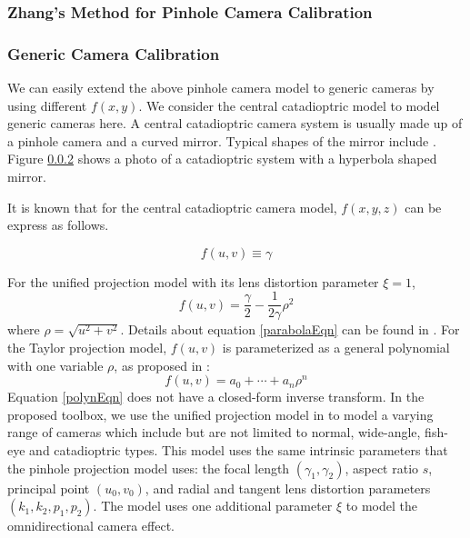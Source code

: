 \documentclass{report}
\begin{document}
\subsubsection{Zhang's Method for Pinhole Camera Calibration}

\subsubsection{Generic Camera Calibration}


We can easily extend the above pinhole camera model to generic cameras by using different $f(x, y)$. We consider the central catadioptric model to model generic cameras here. A central catadioptric camera system is usually made up of a pinhole camera and a curved mirror. Typical shapes of the mirror include . Figure \ref{} shows a photo of a catadioptric system with a hyperbola shaped mirror. 

It is known \cite{} that for the central catadioptric camera model, $f(x, y, z)$ can be express as follows. 
\begin{equation}
\end{equation}


\begin{equation}
f(u, v) \equiv \gamma
\label{pinholeEqn}
\end{equation}


For the unified projection model with its lens distortion parameter $\xi = 1$,
\begin{equation}
f(u, v) = \frac{\gamma}{2} - \frac{1}{2 \gamma} \rho^2
\label{parabolaEqn}
\end{equation}
where $\rho = \sqrt{u^2 + v^2}$. Details about equation \ref{parabolaEqn} can be found in \cite{mei2007single}. For the Taylor projection model, $f(u, v)$ is parameterized as a general polynomial with one variable $\rho$, as proposed in \cite{scaramuzza2006toolbox}: 
\begin{equation}
f(u, v) = a_0 + \cdots + a_n \rho^n
\label{polynEqn}
\end{equation}
Equation \ref{polynEqn} does not have a closed-form inverse transform. In the proposed toolbox, we use the unified projection model in \cite{mei2007single} to model a varying range of cameras which include but are not limited to normal, wide-angle, fish-eye and catadioptric types. This model uses the same intrinsic parameters that the pinhole projection model uses: the focal length $(\gamma_1, \gamma_2)$, aspect ratio $s$, principal point $(u_0, v_0)$, and radial and tangent lens distortion parameters $(k_1, k_2, p_1, p_2)$. The model uses one additional parameter $\xi$ to model the omnidirectional camera effect. 
\end{document}
